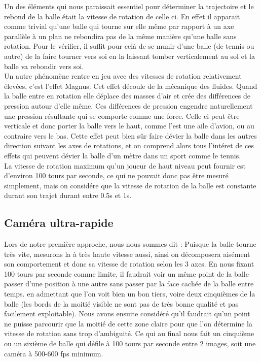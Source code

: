 Un des éléments qui nous paraissait essentiel pour déterminer la trajectoire et le rebond de la balle était la vitesse de rotation de celle ci. En effet il apparait comme trivial qu'une balle qui tourne sur elle même par rapport à un axe parallèle à un plan ne rebondira pas de la même manière qu'une balle sans rotation. Pour le vérifier, il suffit pour celà de se munir d'une balle (de tennis ou autre) de la faire tourner vers soi en la laissant tomber verticalement au sol et la balle va rebondir vers soi.\\

Un autre phénomène rentre en jeu avec des vitesses de rotation relativement élevées, c'est l'effet Magnus. Cet effet découle de la mécanique des fluides. Quand la balle entre en rotation elle déplace des masses d'air et crée des différences de pression autour d'elle même. Ces différences de pression engendre naturellement une pression résultante qui se comporte comme une force. Celle ci peut être verticale et donc porter la balle vers le haut, comme l'est une aile d'avion, ou au contraire vers le bas. Cette effet peut bien sûr faire dévier la balle dans les autres direction suivant les axes de rotations, et on comprend alors tous l'intéret de ces effets qui peuvent dévier la balle d'un mètre dans un sport comme le tennis.\\

La vitesse de rotation maximum qu'un joueur de haut niveau peut fournir est d'environ 100 tours par seconde, ce qui ne pouvait donc pas être mesuré simplement, mais on considére que la vitesse de rotation de la balle est constante durant son trajet durant entre 0.5s et 1s.

\subsection{Caméra ultra-rapide}

Lors de notre première approche, nous nous sommes dit : Puisque la balle tourne très vite, mesurons la à très haute vitesse aussi, ainsi on décomposera aisément son comportement et donc sa vitesse de rotation selon les 3 axes. En nous fixant 100 tours par seconde comme limite, il faudrait voir un même point de la balle passer d'une position à une autre sans passer par la face cachée de la balle entre temps. en admettant que l'on voit bien un bon tiers, voire deux cinquièmes de la balle (les bords de la moitié visible ne sont pas de très bonne qualité et pas facilement exploitable). Nous avons ensuite considéré qu'il faudrait qu'un point ne puisse parcourir que la moitié de cette zone claire pour que l'on détermine la vitesse de rotation sans trop d'ambiguité. Ce qui au final nous fait un cinquième ou un sixième de balle qui défile à 100 tours par seconde entre 2 images, soit une caméra à 500-600 fps minimum.\\

